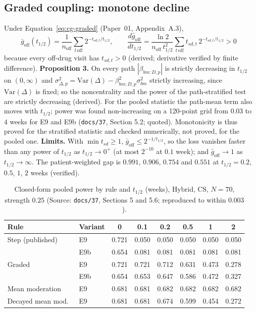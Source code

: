 \documentclass[11pt]{article}
\newcommand{\code}[1]{\texttt{#1}}
\begin{document}
\subsection{Graded coupling: monotone decline}
\label{sec:cg-graded}

Under Equation~\eqref{eq:cg-graded} (Paper~01, Appendix~A.3),
\begin{equation}
\bar g_{\mathrm{off}}(t_{1/2}) = \frac{1}{n_{\mathrm{off}}}
  \sum_{t\,\mathrm{off}} 2^{-t_{sd,t}/t_{1/2}}, \qquad
\frac{d\bar g_{\mathrm{off}}}{dt_{1/2}} =
  \frac{\ln 2}{n_{\mathrm{off}}\,t_{1/2}^2}
  \sum_{t\,\mathrm{off}} t_{sd,t}\,2^{-t_{sd,t}/t_{1/2}} > 0
\label{eq:cg-gbar}
\end{equation}
because every off-drug visit has $t_{sd,t} > 0$ (derived; derivative
verified by finite difference). \textbf{Proposition 3.} On every path
$|\beta_{bm:D,p}|$ is strictly decreasing in $t_{1/2}$ on $(0,\infty)$
and $\sigma_{\Delta,p}^2 = \mathrm{Var}(\Delta) - \beta_{bm:D,p}^2\sigma_{bm}^2$
strictly increasing, since $\mathrm{Var}(\Delta)$ is fixed; so the
noncentrality and the power of the path-stratified test are strictly
decreasing (derived). For the pooled statistic the path-mean term also
moves with $t_{1/2}$; power was found non-increasing on a 120-point
grid from $0.03$ to $4$ weeks for E9 and E9b (\code{docs/37},
Section 5.2; quoted). Monotonicity is thus proved for the stratified
statistic and checked numerically, not proved, for the pooled one.
\textbf{Limits.} With $\min t_{sd} \ge 1$,
$\bar g_{\mathrm{off}} \le 2^{-1/t_{1/2}}$, so the loss vanishes
faster than any power of $t_{1/2}$ as $t_{1/2}\to0^+$ (at most
$2^{-10}$ at $0.1$ week); and $\bar g_{\mathrm{off}}\to1$ as
$t_{1/2}\to\infty$. The patient-weighted gap is $0.991$, $0.906$,
$0.754$ and $0.551$ at $t_{1/2} = 0.2$, $0.5$, $1$, $2$ weeks
(verified).

\begin{table}[h]
\centering\small
\caption{Closed-form pooled power by rule and $t_{1/2}$ (weeks),
Hybrid, CS, $N = 70$, strength $0.25$ (Source: \code{docs/37},
Sections 5 and 5.6; reproduced to within $0.003$).}
\label{tab:cg-power}
\begin{tabular}{@{}llcccccc@{}}
\toprule
Rule & Variant & 0 & 0.1 & 0.2 & 0.5 & 1 & 2 \\
\midrule
Step (published) & E9  & 0.721 & 0.050 & 0.050 & 0.050 & 0.050 & 0.050 \\
                 & E9b & 0.654 & 0.081 & 0.081 & 0.081 & 0.081 & 0.081 \\
Graded           & E9  & 0.721 & 0.721 & 0.712 & 0.631 & 0.473 & 0.278 \\
                 & E9b & 0.654 & 0.653 & 0.647 & 0.586 & 0.472 & 0.327 \\
Mean moderation  & E9  & 0.681 & 0.681 & 0.682 & 0.682 & 0.682 & 0.682 \\
Decayed mean mod.\ & E9 & 0.681 & 0.681 & 0.674 & 0.599 & 0.454 & 0.272 \\
\bottomrule
\end{tabular}
\end{table}
\end{document}
